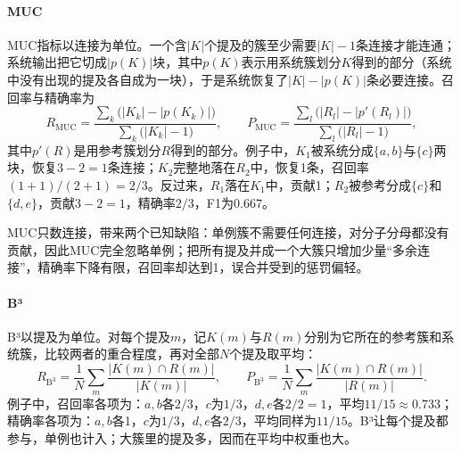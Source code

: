 \paragraph{MUC}
MUC指标以连接为单位。一个含$|K|$个提及的簇至少需要$|K|-1$条连接才能连通；系统输出把它切成$|p(K)|$块，其中$p(K)$表示用系统簇划分$K$得到的部分（系统中没有出现的提及各自成为一块），于是系统恢复了$|K|-|p(K)|$条必要连接。召回率与精确率为
\begin{equation}
  R_{\mathrm{MUC}}=\frac{\sum_k\bigl(|K_k|-|p(K_k)|\bigr)}{\sum_k\bigl(|K_k|-1\bigr)},\qquad
  P_{\mathrm{MUC}}=\frac{\sum_l\bigl(|R_l|-|p'(R_l)|\bigr)}{\sum_l\bigl(|R_l|-1\bigr)},
  \label{eq:nlp-analysis-muc}
\end{equation}
其中$p'(R)$是用参考簇划分$R$得到的部分。例子中，$K_1$被系统分成$\{a,b\}$与$\{c\}$两块，恢复$3-2=1$条连接；$K_2$完整地落在$R_2$中，恢复1条，召回率$(1+1)/(2+1)=2/3$。反过来，$R_1$落在$K_1$中，贡献1；$R_2$被参考分成$\{c\}$和$\{d,e\}$，贡献$3-2=1$，精确率$2/3$，F1为$0.667$。

MUC只数连接，带来两个已知缺陷：单例簇不需要任何连接，对分子分母都没有贡献，因此MUC完全忽略单例；把所有提及并成一个大簇只增加少量“多余连接”，精确率下降有限，召回率却达到1，误合并受到的惩罚偏轻。

\paragraph{B³}
B³以提及为单位。对每个提及$m$，记$K(m)$与$R(m)$分别为它所在的参考簇和系统簇，比较两者的重合程度，再对全部$N$个提及取平均：
\begin{equation}
  R_{\mathrm{B^3}}=\frac1N\sum_m\frac{|K(m)\cap R(m)|}{|K(m)|},\qquad
  P_{\mathrm{B^3}}=\frac1N\sum_m\frac{|K(m)\cap R(m)|}{|R(m)|}.
  \label{eq:nlp-analysis-bcubed}
\end{equation}
例子中，召回率各项为：$a,b$各$2/3$，$c$为$1/3$，$d,e$各$2/2=1$，平均$11/15\approx0.733$；精确率各项为：$a,b$各1，$c$为$1/3$，$d,e$各$2/3$，平均同样为$11/15$。B³让每个提及都参与，单例也计入；大簇里的提及多，因而在平均中权重也大。

